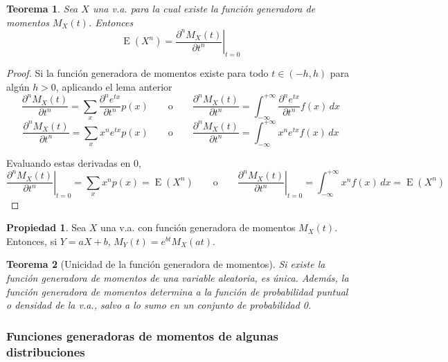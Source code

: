 \documentclass[11pt]{article}
\theoremstyle{plain}
\newtheorem*{teo}{Teorema}
\theoremstyle{definition}
\newtheorem*{prop}{Propiedad}
\theoremstyle{remark}
\newcommand{\esp}[0]{\ensuremath{\operatorname{E}}}  %
\begin{document}
    \begin{teo}
      Sea $X$ una v.a. para la cual existe la función generadora de momentos $M_X(t)$. Entonces
      \[ \esp\left(X^n\right) = \left. \frac{\partial^n M_X(t)}{\partial t^n} \right\vert_{t=0} \]
    \end{teo}

    \begin{proof}
      Si la función generadora de momentos existe para todo $t \in (-h,h)$ para algún $h > 0$, aplicando el lema anterior
      \[ \frac{\partial^n M_X(t)}{\partial t^n} = \sum_x \frac{\partial^n e^{tx}}{\partial t^n} p(x) \qquad \text{o} \qquad \frac{\partial^n M_X(t)}{\partial t^n} = \int_{-\infty}^{+ \infty} \frac{\partial^n e^{tx}}{\partial t^n} f(x) \,dx \]
      \[ \frac{\partial^n M_X(t)}{\partial t^n} = \sum_x x^n e^{tx} p(x) \qquad \text{o} \qquad \frac{\partial^n M_X(t)}{\partial t^n} = \int_{-\infty}^{+ \infty} x^n e^{tx} f(x) \,dx \]

      Evaluando estas derivadas en 0,
      \[ \left. \frac{\partial^n M_X(t)}{\partial t^n} \right\vert_{t=0} = \sum_x x^n p(x) = \esp\left(X^n\right) \qquad \text{o} \qquad \left. \frac{\partial^n M_X(t)}{\partial t^n} \right\vert_{t=0} = \int_{-\infty}^{+ \infty} x^n f(x) \,dx = \esp\left(X^n\right) \]
    \end{proof}

    \begin{prop}
      Sea $X$ una v.a. con función generadora de momentos $M_X(t)$. Entonces, si  $Y = aX + b$, $M_Y(t) = e^{bt} M_X(at)$.
    \end{prop}

    \begin{teo} [Unicidad de la función generadora de momentos]
      Si existe la función generadora de momentos de una variable aleatoria, es única. Además, la función generadora de momentos determina a la función de probabilidad puntual o densidad de la v.a., salvo a lo sumo en un conjunto de probabilidad 0.
    \end{teo}

    \subsubsection{Funciones generadoras de momentos de algunas distribuciones}
\end{document}
